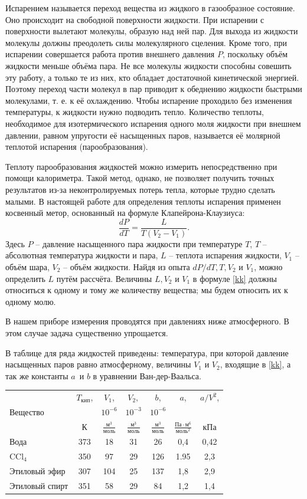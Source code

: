 \documentclass[a4paper,12pt]{article}
\begin{document}
Испарением называется переход вещества из жидкого в газообразное состояние. Оно происходит на свободной поверхности жидкости. При испарении с поверхности вылетают молекулы, образую над ней пар. Для выхода из жидкости молекулы должны преодолеть силы молекулярного сцеления. Кроме того, при испарении совершается работа против внешнего давления $P$, поскольку объём жидкости меньше объёма пара. Не все молекулы жидкости способны совешить эту работу, а только те из них, кто обладает достаточной кинетической энергией. Поэтому переход части молекул в пар приводит к обеднению жидкости быстрыми молекулами, т. е. к её охлаждению. Чтобы испарение проходило без изменения температуры, к жидкости нужно подводить тепло. Количество теплоты, необходимое для изотермического испарения одного моля жидкости при внешнем давлении, равном упругости её насыщенных паров, называется её молярной теплотой испарения (парообразования). 

Теплоту парообразования жидкостей можно измерить непосредственно при помощи калориметра. Такой метод, однако, не позволяет получить точных результатов из-за неконтролируемых потерь тепла, которые трудно сделать малыми. В настоящей работе для определения теплоты испарения применен косвенный метор, основанный на формуле Клапейрона-Клаузиуса: 
\begin{equation} \label{kk}
 \dfrac{dP}{dT}= \dfrac{L}{T(V_2 - V_1)}. 
\end{equation}
Здесь  $P$ -- давление насыщенного пара жидкости при температуре  $T$,  $T$ -- абсолютная температура жидкости и пара, $L$ -- теплота испарения жидкости,  $V_1$ -- объём шара,  $V_2$ -- объём жидкости. Найдя из опыта  $dP/dT, T, V_2$ и $V_1$, можно определить $L$ путём рассчёта. Величины $L, V_2$ и $V_1$ в формуле \eqref{kk} должны относиться к одному и тому же количеству вещества; мы будем относить их к одному молю. 

В нашем приборе измерения проводятся при давлениях ниже атмосферного. В этом случае задача существенно упрощается. 

В таблице для ряда жидкостей приведены: температура, при которой давление насыщенных паров равно атмосферному, величины $V_1$ и $V_2$, входящие в \eqref{kk}, а так же константы $a$ и $b$ в уравнении Ван-дер-Ваальса. 


\begin{center}
\begin{tabular}{|l|*{6}{c|}} 
	\hline
	& $T_{кип}$,&$ V_1$, &$ V_2 , $&$ b$,& $ a$, & $a / V^2$, \\
	Вещество&  & $10^{-6}$ &$10^{-3}$&$10^{-6}$&& \\
	& К &$\frac{м^3}{моль} $&$\frac{м^3}{моль} $&$\frac{м^3}{моль} $&$\frac{Па \cdot м^6}{моль^2} $ &кПа\\ 
	\hline 
	Вода & 373 & 18 & 31 & 26 & 0,4& 0,42 \\ 
	CCl$_4$ & 350 & 97 & 29 & 126 & 1.95 & 2,3 \\ 
	Этиловый эфир & 307 & 104 & 25 & 137 & 1,8 & 2,9 \\ 
	Этиловый спирт & 351 & 58 & 29 & 84 & 1,2 & 1,4 \\ \hline
	\end{tabular}
\end{center}
\end{document}
